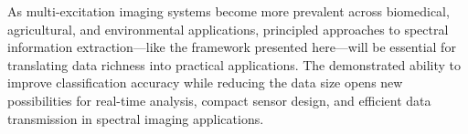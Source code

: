 As multi-excitation imaging systems become more prevalent across biomedical, agricultural, and environmental applications, principled approaches to spectral information extraction---like the framework presented here---will be essential for translating data richness into practical applications.
The demonstrated ability to improve classification accuracy while reducing the data size opens new possibilities for real-time analysis, compact sensor design, and efficient data transmission in spectral imaging applications.